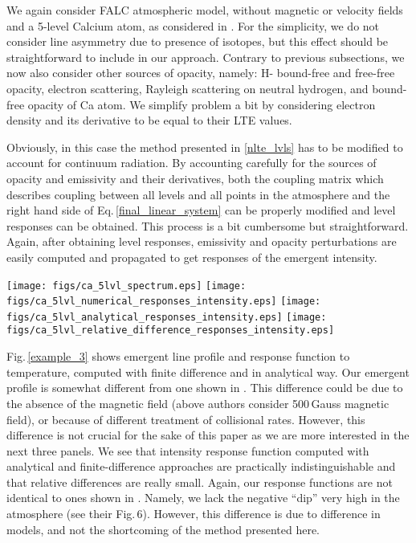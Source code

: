 \documentclass[referee]{aa}
\begin{document}
We again consider FALC atmospheric model, without magnetic or velocity fields and a 5-level Calcium atom, as considered in \citet{Ca_diag_Jaime}. For the simplicity, we do not consider line asymmetry due to presence of isotopes, but this effect should be straightforward to include in our approach. Contrary to previous subsections, we now also consider other sources of opacity, namely: H- bound-free and free-free opacity, electron scattering, Rayleigh scattering on neutral hydrogen, and bound-free opacity of Ca atom. We simplify problem a bit by considering electron density and its derivative to be equal to their LTE values. 

Obviously, in this case the method presented in \ref{nlte_lvls} has to be modified to account for continuum radiation. By accounting carefully for the sources of opacity and emissivity and their derivatives, both the coupling matrix which describes coupling between all levels and all points in the atmosphere and the right hand side of Eq.\,\ref{final_linear_system} can be properly modified and level responses can be obtained. This process is a bit cumbersome but straightforward. Again, after obtaining level responses, emissivity and opacity perturbations are easily computed and propagated to get responses of the emergent intensity.

\begin{figure*}
 \texttt{[image: figs/ca\_5lvl\_spectrum.eps]}
 \texttt{[image: figs/ca\_5lvl\_numerical\_responses\_intensity.eps]}
 \texttt{[image: figs/ca\_5lvl\_analytical\_responses\_intensity.eps]}
 \texttt{[image: figs/ca\_5lvl\_relative\_difference\_responses\_intensity.eps]}
 \caption{Intensity response functions for a 8542 Ca line in FALC model atmosphere. Top left: Emergent line profile; Top right: Numerical (finite difference) computation of intensity responses; Bottom left: Responses computed analytically using the method explained in the paper; Bottom right: Relative differences, normalized with respect to the maximum response, between analytical and numerical computations (in log scale).}
 \label{example_3}
 \end{figure*}

Fig.\,\ref{example_3} shows emergent line profile and response function to temperature, computed with finite difference and in analytical way. Our emergent profile is somewhat different from one shown in \cite{Ca_diag_Jaime}. This difference could be due to the absence of the magnetic field (above authors consider 500\,Gauss magnetic field), or because of different treatment of collisional rates. However, this difference is not crucial for the sake of this paper as we are more interested in the next three panels. We see that intensity response function computed with analytical and finite-difference approaches are practically indistinguishable and that relative differences are really small. Again, our response functions are not identical to ones shown in \cite{Ca_diag_Jaime}. Namely, we lack the negative ``dip'' very high in the atmosphere (see their Fig.\,6). However, this difference is due to difference in models, and not the shortcoming of the method presented here.  
\end{document}
